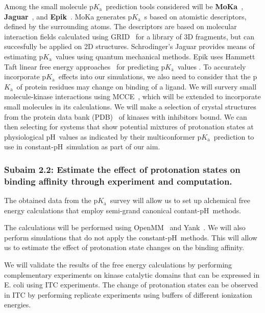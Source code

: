\documentclass[10pt,final]{article}
\newcommand{\pKa}{p$K_\mathrm{a}$\ }
\newcommand{\pH}{p$\mathrm{H}$\ }
\begin{document}
Among the small molecule \pKa prediction tools considered will be \textbf{MoKa}~\cite{Milletti2007a}, \textbf{Jaguar}~\cite{Bochevarov2013a}, and \textbf{Epik}~\cite{Shelley2007a,Greenwood2010a}.
%
MoKa generates \pKa{}s based on atomistic descriptors, defined by the surrounding atoms.
%
The descriptors are based on molecular interaction fields calculated using GRID~\cite{Goodford1985a} for a library of 3D fragments, but can succesfully be applied on 2D structures.
%
Schrodinger's Jaguar provides means of estimating \pKa values using quantum mechanical methods.
%
Epik uses Hammett Taft linear free energy approaches~\cite{Perrin1981a} for predicting \pKa values .
%
To accurately incorporate \pKa effects into our simulations, we also need to consider that the \pKa of protein residues may change on binding of a ligand.
%
We will survery small molecule-kinase interactions using MCCE~\cite{Song2009a}, which will be extended to incorporate small molecules in its calculations.
%
We will make a selection of crystal structures from the protein data bank (PDB)~\cite{Berman2000a} of kinases with inhibitors bound.
%
We can then selecting for systems that show potential mixtures of protonation states at physiological \pH values as indicated by their multiconformer \pKa prediction to use in constant-\pH simulation as part of our aim. 


\subsubsection*{Subaim 2.2: Estimate the effect of protonation states on binding affinity through experiment and computation.}
The obtained data from the \pKa survey will allow us to set up alchemical free energy calculations that employ semi-grand canonical contant-\pH methods.~\cite{Mongan2004a}

The calculations will be performed using OpenMM~\cite{Eastman2013a} and Yank~\cite{Chodera2015a}. We will also perform simulations that do not apply the constant-\pH methods. This will allow us to estimate the effect of protonation state changes on the binding affinity.

We will validate the results of the free energy calculations by performing complementary experiments on kinase catalytic domains that can be expressed in E. coli using ITC experiments.
%
The change of protonation states can be observed in ITC by performing replicate experiments using buffers of different ionization energies.
\end{document}
